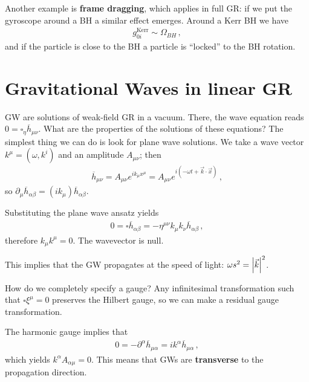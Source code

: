 \documentclass[main.tex]{subfiles}
\begin{document}

Another example is \textbf{frame dragging}, which applies in full GR: if we put the gyroscope around a BH a similar effect emerges. 
Around a Kerr BH we have 
%
\begin{align}
g_{0i}^{\text{Kerr}} \sim \Omega_{BH} 
\,,
\end{align}
%
and if the particle is close to the BH a particle is ``locked'' to the BH rotation. 

\section{Gravitational Waves in linear GR}

GW are solutions of weak-field GR in a vacuum.
There, the wave equation reads \(0 = \square _\eta \overline{h}_{\mu \nu }\). What are the properties of the solutions of these equations? 
The simplest thing we can do is look for plane wave solutions. We take a wave vector \(k^{\mu } = (\omega , k^{i})\) and an amplitude \(A_{\mu \nu }\); then 
%
\begin{align}
\overline{h}_{\mu \nu } = A_{\mu \nu } e^{i k_\mu x^{\mu }} = A_{\mu \nu } e^{i (- \omega t + \vec{k} \cdot \vec{x}) }
\,,
\end{align}
%
so \(\partial_{\mu } \overline{h}_{\alpha \beta } =  (i k_\mu ) \overline{h}_{\alpha \beta }\). 

Substituting the plane wave ansatz yields 
%
\begin{align}
0 = \square \overline{h}_{\alpha \beta } = - \eta^{\mu \nu } k_\mu k_\nu \overline{h}_{\alpha \beta }
\,,
\end{align}
%
therefore \(k_{\mu }k^{\mu } = 0\). The wavevector is null. 

This implies that the GW propagates at the speed of light: \(\omega s^2 = \abs{\vec{k}}^2\). 

How do we completely specify a gauge?
Any infinitesimal transformation such that \(\square \xi^{\mu } = 0\) preserves the Hilbert gauge, so we can make a residual gauge transformation. 

The harmonic gauge implies that 
%
\begin{align}
0 = - \partial^{\alpha } \overline{h}_{\mu \alpha } = i k^{\alpha } \overline{h}_{\mu \alpha }
\,,
\end{align}
%
which yields \(k^{\alpha } A_{\alpha \mu } = 0\). This means that GWs are \textbf{transverse} to the propagation direction. 
\end{document}
